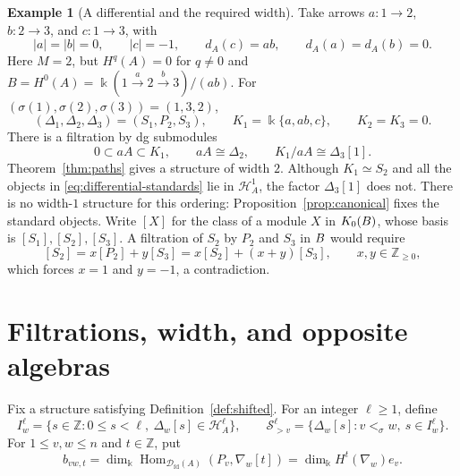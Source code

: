 \documentclass[11pt,a4paper]{article}
\newcommand{\D}{\mathcal D}
\renewcommand{\H}{\mathcal H}
\newcommand{\ZZ}{\mathbb{Z}}
\newcommand{\std}{\Delta}
\newcommand{\costd}{\nabla}
\DeclareMathOperator{\fd}{fd}
\DeclareMathOperator{\Hom}{Hom}
\let\mod\relax
\DeclareMathOperator{\mod}{mod}
\theoremstyle{plain}
\theoremstyle{definition}
\newtheorem{example}[theorem]{Example}
\numberwithin{equation}{section}
\begin{document}
\begin{example}[A differential and the required width]\label{ex:differential}
Take arrows $a:1\to2$, $b:2\to3$, and $c:1\to3$, with
\begin{equation}\label{eq:differential}
 |a|=|b|=0,\qquad |c|=-1,\qquad
 d_A(c)=ab,\qquad d_A(a)=d_A(b)=0.
\end{equation}
Here $M=2$, but $H^q(A)=0$ for $q\neq0$ and
$B=H^0(A)=\Bbbk(1\xrightarrow{a}2\xrightarrow{b}3)/(ab)$.
For $(\sigma(1),\sigma(2),\sigma(3))=(1,3,2)$,
\begin{equation}\label{eq:differential-standards}
 (\std_1,\std_2,\std_3)=(S_1,P_2,S_3),\qquad
 K_1=\Bbbk\{a,ab,c\},\qquad K_2=K_3=0.
\end{equation}
There is a filtration by dg submodules
\begin{equation}\label{eq:differential-filtration}
 0\subset aA\subset K_1,\qquad
 aA\cong\std_2,\qquad K_1/aA\cong\std_3[1].
\end{equation}
Theorem~\ref{thm:paths} gives a structure of width $2$.
Although $K_1\simeq S_2$ and all the objects in
\eqref{eq:differential-standards} lie in $\H_A^1$, the factor
$\std_3[1]$ does not. There is no width-$1$ structure for this
ordering: Proposition~\ref{prop:canonical} fixes the standard objects.
Write $[X]$ for the class of a module $X$ in $K_0(\mod B)$, whose
basis is $[S_1],[S_2],[S_3]$. A filtration of $S_2$ by $P_2$ and $S_3$
in $\mod B$ would require
\[
 [S_2]=x[P_2]+y[S_3]=x[S_2]+(x+y)[S_3],
 \qquad x,y\in\ZZ_{\geq0},
\]
which forces $x=1$ and $y=-1$, a contradiction.
\end{example}

\section{Filtrations, width, and opposite algebras}\label{sec:filtrations}

Fix a structure satisfying Definition~\ref{def:shifted}.
For an integer $\ell\geq1$, define
\begin{equation}\label{eq:allowed}
 I_w^\ell=\{s\in\ZZ:0\leq s<\ell,\ \std_w[s]\in\H_A^\ell\},
 \qquad
 \mathcal S_{>v}^\ell=\{\std_w[s]:v<_\sigma w,\ s\in I_w^\ell\}.
\end{equation}
For $1\leq v,w\leq n$ and $t\in\ZZ$, put
\begin{equation}\label{eq:numerical}
 b_{vw,t}=\dim_{\Bbbk}\Hom_{\D_{\fd}(A)}(P_v,\costd_w[t])
         =\dim_{\Bbbk}H^t(\costd_w)e_v.
\end{equation}
\end{document}
